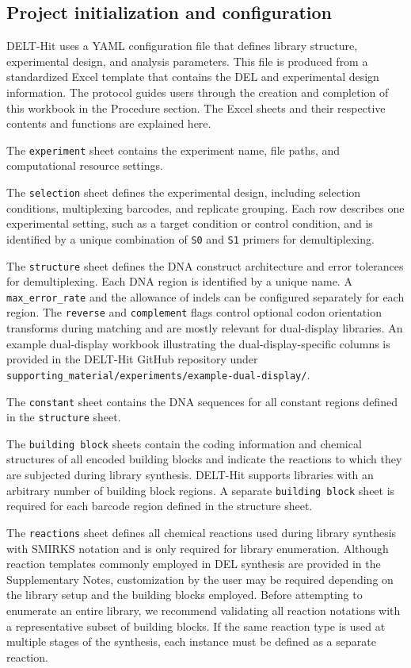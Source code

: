 \documentclass[pdflatex,sn-nature]{sn-jnl}
\begin{document}
\subsection{Project initialization and configuration}

DELT-Hit uses a YAML configuration file that defines library structure, experimental design, and analysis parameters. This file is produced from a standardized Excel template that contains the DEL and experimental design information. The protocol guides users through the creation and completion of this workbook in the Procedure section. The Excel sheets and their respective contents and functions are explained here. 

The \texttt{experiment} sheet contains the experiment name, file paths, and computational resource settings. 

The \texttt{selection} sheet defines the experimental design, including selection conditions, multiplexing barcodes, and replicate grouping. Each row describes one experimental setting, such as a target condition or control condition, and is identified by a unique combination of \texttt{S0} and \texttt{S1} primers for demultiplexing. 

The \texttt{structure} sheet defines the DNA construct architecture and error tolerances for demultiplexing. Each DNA region is identified by a unique name. A \texttt{max\_error\_rate} and the allowance of indels can be configured separately for each region. The \texttt{reverse} and \texttt{complement} flags control optional codon orientation transforms during matching and are mostly relevant for dual-display libraries. An example dual-display workbook illustrating the dual-display-specific columns is provided in the DELT-Hit GitHub repository under \texttt{supporting\_material/experiments/example-dual-display/}. 

The \texttt{constant} sheet contains the DNA sequences for all constant regions defined in the \texttt{structure} sheet. 

The \texttt{building block} sheets contain the coding information and chemical structures of all encoded building blocks and indicate the reactions to which they are subjected during library synthesis. DELT-Hit supports libraries with an arbitrary number of building block regions. A separate \texttt{building block} sheet is required for each barcode region defined in the structure sheet. 

The \texttt{reactions} sheet defines all chemical reactions used during library synthesis with SMIRKS notation\cite{ref34} and is only required for library enumeration. Although reaction templates commonly employed in DEL synthesis are provided in the Supplementary Notes, customization by the user may be required depending on the library setup and the building blocks employed. Before attempting to enumerate an entire library, we recommend validating all reaction notations with a representative subset of building blocks. If the same reaction type is used at multiple stages of the synthesis, each instance must be defined as a separate reaction.
\end{document}

